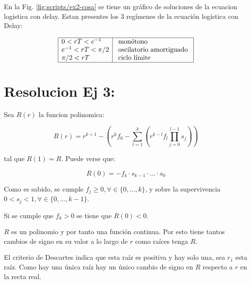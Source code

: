 \documentclass[twocolumn,aps,prl]{revtex4-1}
\begin{document}
En la Fig. \ref{fig:scripts/ex2-cosa} se tiene un gráfico de soluciones de la ecuacion logistica con delay. Estan presentes los 3 regímenes de la ecuación logística con Delay:

$$
\begin{array}{|l|l|}
\hline 0<r T <e^{-1} & \text { monótono } \\
e^{-1}<r T <\pi / 2 & \text { oscilatorio amortiguado } \\
\pi / 2<r T  & \text { ciclo límite } \\
\hline
\end{array}
$$





% 
%                                 
% 

\section{Resolucion Ej 3:}

Sea $R(r)$ la funcion polinomica:

\begin{equation}\label{eqn:etiqueta1}
    R(r) = r^{k+1} 
        - \left( 
            r^k f_0 
            - \sum_{l=1}^k 
            \left( 
            r^{k-l} f_l \prod_{j=0}^{l-1} s_j  
            \right) 
        \right)
\end{equation}

tal que $R(1)=R$. Puede verse que:

\begin{equation}\label{eqn:etiqueta2}
    R(0) = - f_k \cdot  s_{k-1} \cdot \ldots \cdot s_{0}
\end{equation}

Como es sabido, se cumple $f_j \geq 0, \forall \in \lbrace 0, \ldots, k \rbrace$, y sobre la supervivencia $  0 < s_j < 1, \forall \in \lbrace 0, \ldots, k - 1 \rbrace$.

Si se cumple que $f_k > 0$ se tiene que $R(0) < 0$. 

$R$ es un polinomio y por tanto una función continua. Por esto tiene tantos cambios de signo en su valor a lo largo de $r$ como raíces tenga $R$. 

El criterio de Descartes indica que esta raíz es positiva y hay solo una, sea $r_1$ esta raíz. Como hay una única raíz hay un único cambio de signo en $R$ respecto a $r$ en la recta real. 
\end{document}
